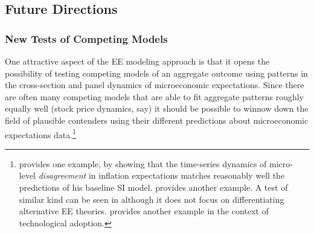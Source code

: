 \subsection{Future Directions}\label{subsec:future}\hypertarget{future}{}

\subsubsection{New Tests of Competing Models}
One attractive aspect of the EE modeling approach is that it opens the possibility of testing competing models of an aggregate outcome using patterns in the cross-section and panel dynamics of microeconomic expectations.  Since there are often many competing models that are able to fit aggregate patterns roughly equally well (stock price dynamics, say) it should be possible to winnow down the field of plausible contenders using their different predictions about microeconomic expectations data.\footnote{\cite{carroll2001epidemiology} provides one example, by showing that the time-series dynamics of micro-level \textit{disagreement} in inflation expectations matches reasonably well the predictions of his baseline SI model.  \cite{banerjee2013diffusion} provides another example.  A test of similar kind can be  seen in \cite{coibion2012can} although it does not focus on differentiating alternative EE theories.  \cite{banerjee2013diffusion} provides another example in the context of technological adoption.}

